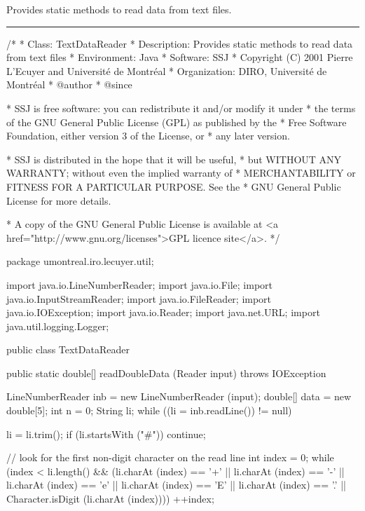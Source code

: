 
Provides static methods to read data from text files.

\bigskip\hrule
\begin{code}
\begin{hide}
/*
 * Class:        TextDataReader
 * Description:  Provides static methods to read data from text files
 * Environment:  Java
 * Software:     SSJ 
 * Copyright (C) 2001  Pierre L'Ecuyer and Université de Montréal
 * Organization: DIRO, Université de Montréal
 * @author       
 * @since

 * SSJ is free software: you can redistribute it and/or modify it under
 * the terms of the GNU General Public License (GPL) as published by the
 * Free Software Foundation, either version 3 of the License, or
 * any later version.

 * SSJ is distributed in the hope that it will be useful,
 * but WITHOUT ANY WARRANTY; without even the implied warranty of
 * MERCHANTABILITY or FITNESS FOR A PARTICULAR PURPOSE.  See the
 * GNU General Public License for more details.

 * A copy of the GNU General Public License is available at
   <a href="http://www.gnu.org/licenses">GPL licence site</a>.
 */
\end{hide}
package umontreal.iro.lecuyer.util;\begin{hide}

import java.io.LineNumberReader;
import java.io.File;
import java.io.InputStreamReader;
import java.io.FileReader;
import java.io.IOException;
import java.io.Reader;
import java.net.URL;
import java.util.logging.Logger;
\end{hide}


public class TextDataReader\begin{hide} {
   private static Logger log = Logger.getLogger ("umontreal.iro.lecuyer.util");
\end{hide}

   public static double[] readDoubleData (Reader input) throws IOException\begin{hide} {
      LineNumberReader inb = new LineNumberReader (input);
      double[] data = new double[5];
      int n = 0;
      String li;
      while ((li = inb.readLine()) != null) {
        li = li.trim();
        if (li.startsWith ("#"))
           continue;

         // look for the first non-digit character on the read line
         int index = 0;
         while (index < li.length() &&
            (li.charAt (index) == '+' || li.charAt (index) == '-' ||
             li.charAt (index) == 'e' || li.charAt (index) == 'E' ||
             li.charAt (index) == '.' || Character.isDigit (li.charAt (index))))
           ++index; 

}}
\end{hide}
\end{code}
